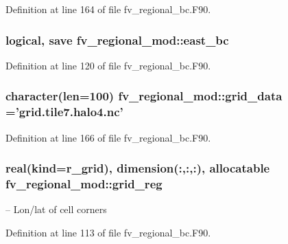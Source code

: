 Definition at line 164 of file fv\-\_\-regional\-\_\-bc.\-F90.

\subsubsection[{east\-\_\-bc}]{\setlength{\rightskip}{0pt plus 5cm}logical, save fv\-\_\-regional\-\_\-mod\-::east\-\_\-bc\hspace{0.3cm}{\ttfamily [private]}}\label{classfv__regional__mod_abba04d13f69846096203d294e6224476}


Definition at line 120 of file fv\-\_\-regional\-\_\-bc.\-F90.

\subsubsection[{grid\-\_\-data}]{\setlength{\rightskip}{0pt plus 5cm}character(len=100) fv\-\_\-regional\-\_\-mod\-::grid\-\_\-data ='grid.\-tile7.\-halo4.\-nc'\hspace{0.3cm}{\ttfamily [private]}}\label{classfv__regional__mod_af44c16e69ea0e0f34f3fd45b9bdb7380}


Definition at line 166 of file fv\-\_\-regional\-\_\-bc.\-F90.

\subsubsection[{grid\-\_\-reg}]{\setlength{\rightskip}{0pt plus 5cm}real(kind=r\-\_\-grid), dimension(\-:,\-:,\-:), allocatable fv\-\_\-regional\-\_\-mod\-::grid\-\_\-reg\hspace{0.3cm}{\ttfamily [private]}}\label{classfv__regional__mod_affa97bf1e197ce68252597eb38a2ebd7}


-- Lon/lat of cell corners 



Definition at line 113 of file fv\-\_\-regional\-\_\-bc.\-F90.

